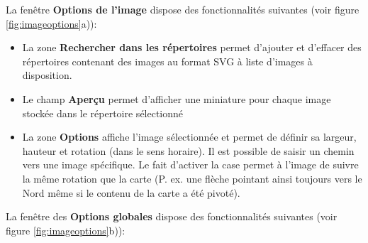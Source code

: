 
La fenêtre \textbf{Options de l'image} dispose des fonctionnalités suivantes (voir figure \ref{fig:imageoptions}a)):

\begin{itemize}[label=--]
\item La zone \textbf{Rechercher dans les répertoires} permet d'ajouter et d'effacer des répertoires contenant des images au format SVG à liste d'images à disposition.
\item Le champ \textbf{Aperçu} permet d'afficher une miniature pour chaque image stockée dans le répertoire sélectionné
\item La zone \textbf{Options} affiche l'image sélectionnée et permet de définir sa largeur, hauteur et rotation (dans le sens horaire). Il est possible de saisir un chemin vers une image spécifique. Le fait d'activer la case  permet à l'image de suivre la même rotation que la carte (P. ex. une flèche pointant ainsi toujours vers le Nord même si le contenu de la carte a été pivoté).
\end{itemize}


La fenêtre des \textbf{Options globales} dispose des fonctionnalités suivantes (voir figure  \ref{fig:imageoptions}b)):

